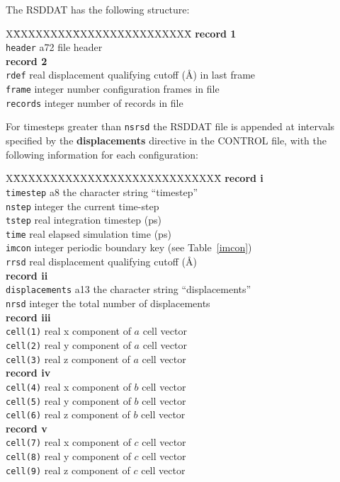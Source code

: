 The RSDDAT has the following structure:
\begin{tabbing}
X\=XXXXXXXX\=XXXXXXXXXXXXXXXX\=\kill
{\bf record 1} \\
\> {\tt header}  \> a72     \> file header \\
{\bf record 2} \\
\> {\tt rdef}    \> real    \> displacement qualifying cutoff (\AA) in last frame \\
\> {\tt frame}   \> integer \> number configuration frames in file \\
\> {\tt records} \> integer \> number of records in file
\end{tabbing}

For timesteps greater than {\tt nsrsd} the RSDDAT file is
appended at intervals specified by the {\bf displacements} directive
in the CONTROL file, with the following information for each
configuration:
\begin{tabbing}
X\=XXXXXXXXXXXX\=XXXXXXXXXXXXXXXX\=\kill
{\bf record i} \\
\> {\tt timestep}      \> a8      \> the character string ``timestep'' \\
\> {\tt nstep}         \> integer \> the current time-step \\
\> {\tt tstep}         \> real    \> integration timestep (ps) \\
\> {\tt time}          \> real    \> elapsed simulation time (ps) \\
\> {\tt imcon}         \> integer \> periodic boundary key (see Table~\ref{imcon}) \\
\> {\tt rrsd}          \> real    \> displacement qualifying cutoff (\AA) \\
{\bf record ii} \\
\> {\tt displacements} \> a13     \> the character string ``displacements'' \\
\> {\tt nrsd}          \> integer \> the total number of displacements \\
{\bf record iii} \\
\> {\tt cell(1)}       \> real    \> x component of $a$ cell vector \\
\> {\tt cell(2)}       \> real    \> y component of $a$ cell vector \\
\> {\tt cell(3)}       \> real    \> z component of $a$ cell vector \\
{\bf record iv} \\
\> {\tt cell(4)}       \> real    \> x component of $b$ cell vector \\
\> {\tt cell(5)}       \> real    \> y component of $b$ cell vector \\
\> {\tt cell(6)}       \> real    \> z component of $b$ cell vector \\
{\bf record v} \\
\> {\tt cell(7)}       \> real    \> x component of $c$ cell vector \\
\> {\tt cell(8)}       \> real    \> y component of $c$ cell vector \\
\> {\tt cell(9)}       \> real    \> z component of $c$ cell vector
\end{tabbing}
